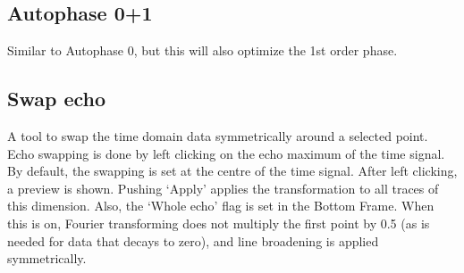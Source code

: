 \documentclass[11pt,a4paper]{article}
\begin{document}
\subsection{Autophase 0+1}
Similar to Autophase 0, but this will also optimize the 1st order phase.

\subsection{Swap echo}
A tool to swap the time domain data symmetrically around a selected point.
Echo swapping is done by left clicking on the echo maximum of the time signal.
By default, the swapping is set at the centre of the time signal.
After left clicking, a preview is shown.
Pushing `Apply' applies the transformation to all traces of this dimension.
Also, the `Whole echo' flag is set in the Bottom Frame.
When this is on, Fourier transforming does not multiply the first point by 0.5 (as is needed for data that decays to zero), and line broadening is applied symmetrically.



\end{document}
